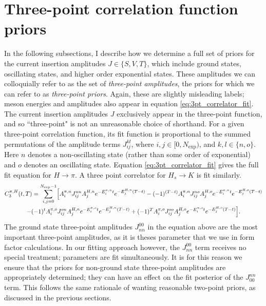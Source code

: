 \section{Three-point correlation function priors}\label{sec:3pt_priors}
In the following subsections, I describe how we determine a full set of priors for the current insertion amplitudes $J\in\{S,V,T\}$, which include ground states, oscillating states, and higher order exponential states. These amplitudes we can colloquially refer to as the set of \textit{three-point amplitudes}, the priors for which we can refer to as \textit{three-point priors}.  Again, these are slightly misleading labels; meson energies and amplitudes also appear in equation \ref{eq:3pt_correlator_fit}.  The current insertion amplitudes $J$ exclusively appear in the three-point function, and so ``three-point" is not an unreasonable choice of shorthand.  For a given three-point correlation function, its fit function is proportional to the summed permutations of the amplitude terms $J_{ij}^{kl}$, where $i,j \in [0,N_\mathrm{exp})$, and $k,l \in \{n,o\}$.  Here $n$ denotes a non-oscillating state (rather than some order of exponential) and $o$ denotes an oscillating state.  Equation \ref{eq:3pt_correlator_fit} gives the full fit equation for $H\rightarrow\pi$.  A three point correlator for $H_s\rightarrow K$ is fit similarly.   
\begin{multline} \label{eq:3pt_correlator_fit}
    C_3^{\pi,H}(t,T) = 
    \sum_{i,j=0}^{N_\text{exp}-1} \Bigl[A^{\pi,n}_i {J_{ij}^{nn}} A^{H,n}_j e^{-E^{\pi,n}_it} e^{-E^{H,n}_j(T-t)} 
     -(-1)^{(T-t)} A^{\pi,n}_i J_{ij}^{no} A^{H,o}_j e^{-E^{\pi,n}_it} e^{-E^{H,o}_j(T-t)} \\
    -(-1)^t A^{\pi,o}_i J_{ij}^{on} A^{H,n}_j e^{-E^{\pi,o}_it} e^{-E^{H,n}_j(T-t)} 
     +(-1)^T A^{\pi,o}_i J_{ij}^{oo} A^{H,o}_j e^{-E^{\pi,o}_it} e^{-E^{H,o}_j(T-t)}\Bigr].
\end{multline}
The ground state three-point amplitudes $J_{nn}^{00}$ in the equation above are the most important three-point amplitudes, as it is theses parameter that we use in form factor calculations.  In our fitting approach however, the $J_{nn}^{00}$ term receives no special treatment; parameters are fit simultaneously.  It is for this reason we ensure that the priors for non-ground state three-point amplitudes are appropriately determined; they can have an effect on the fit posterior of the $J_{00}^{nn}$ term.  This follows the same rationale of wanting reasonable two-point priors, as discussed in the previous sections.

